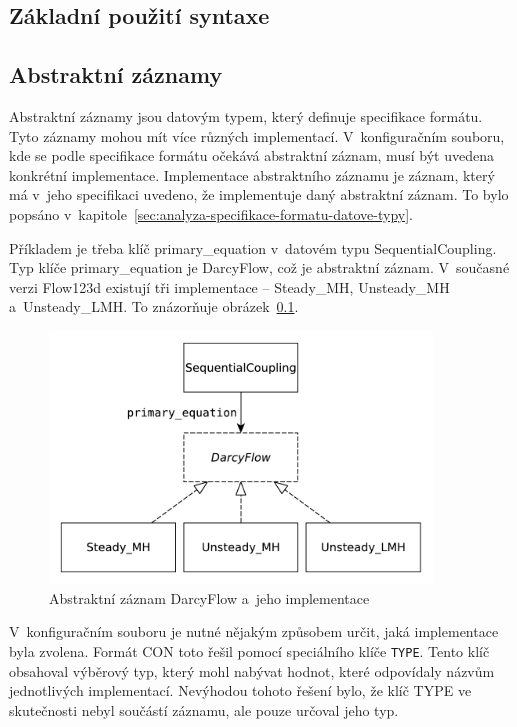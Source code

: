 \documentclass[FM,bw,DP]{tulthesis}
\begin{document}
\subsection{Základní použití syntaxe}


\subsection{Abstraktní záznamy}
\label{sec:navrh-yaml-abstrakni-zaznamy}
Abstraktní záznamy jsou datovým typem, který definuje specifikace formátu. Tyto záznamy mohou mít více různých implementací. V~konfiguračním souboru, kde se podle specifikace formátu očekává abstraktní záznam, musí být uvedena konkrétní implementace. Implementace abstraktního záznamu je záznam, který má v~jeho specifikaci uvedeno, že implementuje daný abstraktní záznam. To bylo popsáno v~kapitole~\ref{sec:analyza-specifikace-formatu-datove-typy}.

Příkladem je třeba klíč primary\_equation v~datovém typu SequentialCoupling. Typ klíče primary\_equation je DarcyFlow, což je abstraktní záznam. V~současné verzi Flow123d existují tři implementace -- Steady\_MH, Unsteady\_MH a~Unsteady\_LMH. To znázorňuje obrázek~\ref{}.

\begin{figure}[h]
	\centering
    \includegraphics[height=190pt]{../img/abstract_record_darcyflow.pdf}
    \caption{Abstraktní záznam DarcyFlow a~jeho implementace}
	\label{img:abstract_record_darcyflow}
\end{figure}

V~konfiguračním souboru je nutné nějakým způsobem určit, jaká implementace byla zvolena. Formát CON toto řešil pomocí speciálního klíče \texttt{TYPE}. Tento klíč obsahoval výběrový typ, který mohl nabývat hodnot, které odpovídaly názvům jednotlivých implementací. Nevýhodou tohoto řešení bylo, že klíč TYPE ve skutečnosti nebyl součástí záznamu, ale pouze určoval jeho typ.
\end{document}
